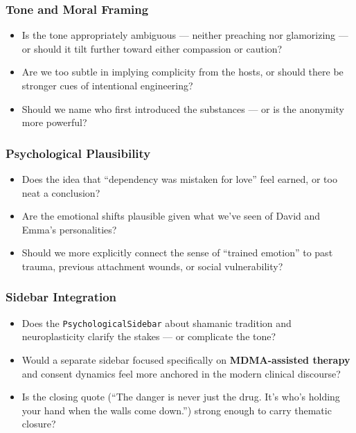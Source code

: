 \subsubsection*{Tone and Moral Framing}

\begin{itemize}
  \item Is the tone appropriately ambiguous — neither preaching nor glamorizing — or should it tilt further toward either compassion or caution?
  \item Are we too subtle in implying complicity from the hosts, or should there be stronger cues of intentional engineering?
  \item Should we name who first introduced the substances — or is the anonymity more powerful?
\end{itemize}

\subsubsection*{Psychological Plausibility}

\begin{itemize}
  \item Does the idea that “dependency was mistaken for love” feel earned, or too neat a conclusion?
  \item Are the emotional shifts plausible given what we’ve seen of David and Emma’s personalities?
  \item Should we more explicitly connect the sense of “trained emotion” to past trauma, previous attachment wounds, or social vulnerability?
\end{itemize}

\subsubsection*{Sidebar Integration}

\begin{itemize}
  \item Does the \texttt{PsychologicalSidebar} about shamanic tradition and neuroplasticity clarify the stakes — or complicate the tone?
  \item Would a separate sidebar focused specifically on \textbf{MDMA-assisted therapy} and consent dynamics feel more anchored in the modern clinical discourse?
  \item Is the closing quote (``The danger is never just the drug. It’s who’s holding your hand when the walls come down.'') strong enough to carry thematic closure?
\end{itemize}

